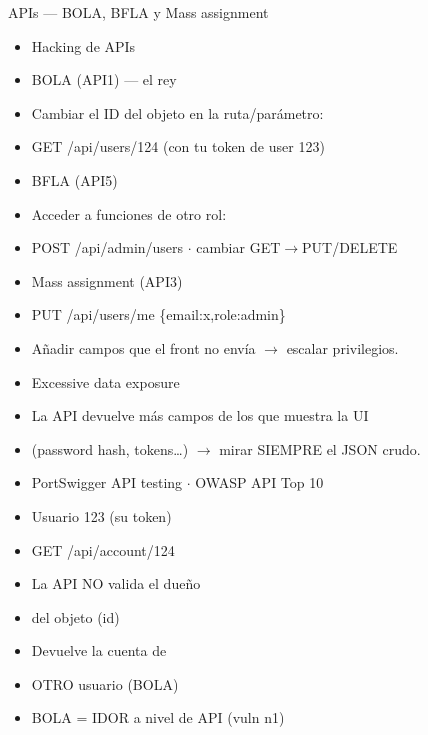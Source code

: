 \documentclass[aspectratio=169,10pt]{beamer}
\begin{document}
\begin{frame}[allowframebreaks]{APIs --- BOLA, BFLA y Mass assignment}
\small
  \begin{itemize}
  \item Hacking de APIs
  \item BOLA (API1) --- el rey
  \item Cambiar el ID del objeto en la ruta/parámetro:
  \item GET /api/users/124 (con tu token de user 123)
  \item BFLA (API5)
  \item Acceder a funciones de otro rol:
  \item POST /api/admin/users $\cdot$ cambiar GET$\rightarrow$PUT/DELETE
  \item Mass assignment (API3)
  \item PUT /api/users/me \{\textquotedbl{}email\textquotedbl{}:\textquotedbl{}x\textquotedbl{},\textquotedbl{}role\textquotedbl{}:\textquotedbl{}admin\textquotedbl{}\}
  \item Añadir campos que el front no envía $\rightarrow$ escalar privilegios.
  \item Excessive data exposure
  \item La API devuelve más campos de los que muestra la UI
  \item (password hash, tokens\dots{}) $\rightarrow$ mirar SIEMPRE el JSON crudo.
  \item PortSwigger API testing $\cdot$ OWASP API Top 10
  \item Usuario 123 (su token)
  \item GET /api/account/124
  \item La API NO valida el dueño
  \item del objeto (id)
  \item Devuelve la cuenta de
  \item OTRO usuario (BOLA)
  \item BOLA = IDOR a nivel de API (vuln n1)
  \end{itemize}
\end{frame}
\end{document}
